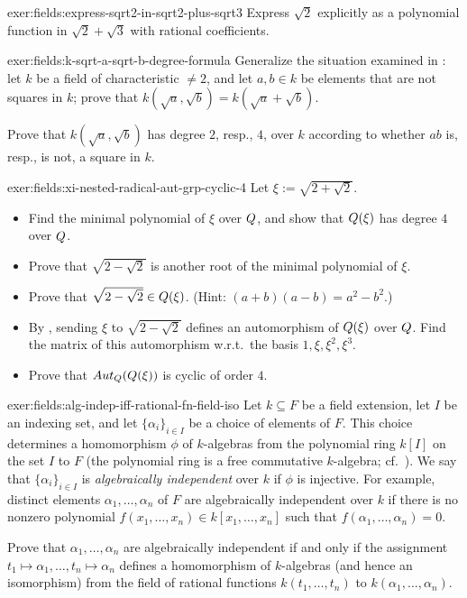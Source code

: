 \begin{exer}{}{exer:fields:express-sqrt2-in-sqrt2-plus-sqrt3}
  Express $\sqrt{2}$ explicitly as a polynomial function in
  $\sqrt{2} + \sqrt{3}$ with rational coefficients.
\end{exer}

\begin{exer}{}{exer:fields:k-sqrt-a-sqrt-b-degree-formula}
  Generalize the situation examined in :
  let $k$ be a field of characteristic $\neq 2$, and let $a, b \in k$
  be elements that are not squares in $k$; prove that
  $k(\sqrt{a}, \sqrt{b}) = k(\sqrt{a} + \sqrt{b})$.

  Prove that $k(\sqrt{a}, \sqrt{b})$ has degree $2$, resp., $4$, over
  $k$ according to whether $ab$ is, resp., is not, a square in $k$.
\end{exer}

\begin{exer}{}{exer:fields:xi-nested-radical-aut-grp-cyclic-4}
  Let $\xi := \sqrt{2 + \sqrt{2}}$.
  \begin{itemize}
  \item Find the minimal polynomial of $\xi$ over $Q$, and show that
    $Q(\xi)$ has degree $4$ over $Q$.
  \item Prove that $\sqrt{2 - \sqrt{2}}$ is another root of the
    minimal polynomial of $\xi$.
  \item Prove that $\sqrt{2 - \sqrt{2}} \in Q(\xi)$. (Hint:
    $(a+b)(a-b) = a^2 - b^2$.)
  \item By , sending $\xi$ to
    $\sqrt{2 - \sqrt{2}}$ defines an automorphism of $Q(\xi)$ over
    $Q$. Find the matrix of this automorphism w.r.t.\ the basis
    $1, \xi, \xi^2, \xi^3$.
  \item Prove that $Aut_{Q}(Q(\xi))$ is cyclic of order $4$.
  \end{itemize}
\end{exer}

\begin{exer}{}{exer:fields:alg-indep-iff-rational-fn-field-iso}
  Let $k \subseteq F$ be a field extension, let $I$ be an indexing
  set, and let ${\{\alpha_i\}}_{i \in I}$ be a choice of elements of
  $F$. This choice determines a homomorphism $\phi$ of $k$-algebras
  from the polynomial ring $k[I]$ on the set $I$ to $F$ (the
  polynomial ring is a free commutative $k$-algebra; cf.\
  ). We say that
  ${\{\alpha_i\}}_{i \in I}$ is \emph{algebraically independent} over
  $k$ if $\phi$ is injective. For example, distinct elements
  $\alpha_1, \dots, \alpha_n$ of $F$ are algebraically independent
  over $k$ if there is no nonzero polynomial
  $f(x_1, \dots, x_n) \in k[x_1, \dots, x_n]$ such that
  $f(\alpha_1, \dots, \alpha_n) = 0$.

  Prove that $\alpha_1, \dots, \alpha_n$ are algebraically independent
  if and only if the assignment
  $t_1 \mapsto \alpha_1, \dots, t_n \mapsto \alpha_n$ defines a
  homomorphism of $k$-algebras (and hence an isomorphism) from the
  field of rational functions $k(t_1, \dots, t_n)$ to
  $k(\alpha_1, \dots, \alpha_n)$.
\end{exer}

